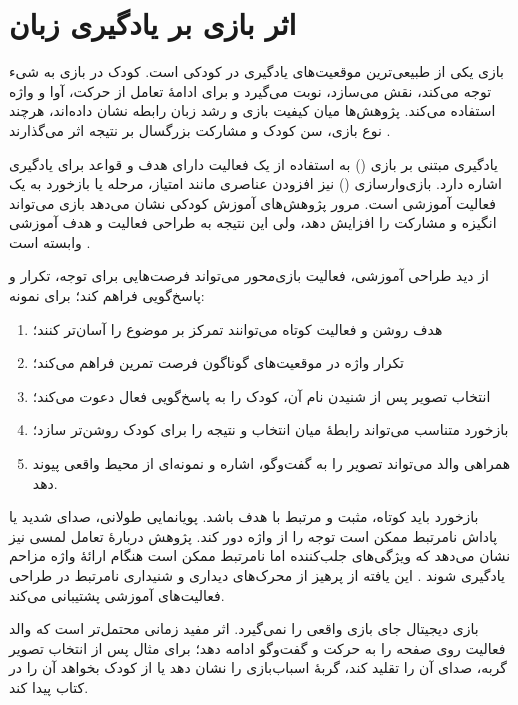 \section{اثر بازی بر یادگیری زبان}

بازی یکی از طبیعی‌ترین موقعیت‌های یادگیری در کودکی است. کودک در بازی به شیء توجه می‌کند، نقش می‌سازد، نوبت می‌گیرد و برای ادامهٔ تعامل از حرکت، آوا و واژه استفاده می‌کند. پژوهش‌ها میان کیفیت بازی و رشد زبان رابطه نشان داده‌اند، هرچند نوع بازی، سن کودک و مشارکت بزرگسال بر نتیجه اثر می‌گذارند \cite{Toub2018PlayLanguage}.

یادگیری مبتنی بر بازی () به استفاده از یک فعالیت دارای هدف و قواعد برای یادگیری اشاره دارد. بازی‌وارسازی () نیز افزودن عناصری مانند امتیاز، مرحله یا بازخورد به یک فعالیت آموزشی است. مرور پژوهش‌های آموزش کودکی نشان می‌دهد بازی می‌تواند انگیزه و مشارکت را افزایش دهد، ولی این نتیجه به طراحی فعالیت و هدف آموزشی وابسته است \cite{Alotaibi2024GameBased}.

از دید طراحی آموزشی، فعالیت بازی‌محور می‌تواند فرصت‌هایی برای توجه، تکرار و پاسخ‌گویی فراهم کند؛ برای نمونه:

\begin{enumerate}
\item هدف روشن و فعالیت کوتاه می‌توانند تمرکز بر موضوع را آسان‌تر کنند؛
\item تکرار واژه در موقعیت‌های گوناگون فرصت تمرین فراهم می‌کند؛
\item انتخاب تصویر پس از شنیدن نام آن، کودک را به پاسخ‌گویی فعال دعوت می‌کند؛
\item بازخورد متناسب می‌تواند رابطهٔ میان انتخاب و نتیجه را برای کودک روشن‌تر سازد؛
\item همراهی والد می‌تواند تصویر را به گفت‌وگو، اشاره و نمونه‌ای از محیط واقعی پیوند دهد.
\end{enumerate}

بازخورد باید کوتاه، مثبت و مرتبط با هدف باشد. پویانمایی طولانی، صدای شدید یا پاداش نامرتبط ممکن است توجه را از واژه دور کند. پژوهش دربارهٔ تعامل لمسی نیز نشان می‌دهد که ویژگی‌های جلب‌کننده اما نامرتبط ممکن است هنگام ارائهٔ واژه مزاحم یادگیری شوند \cite{RussoJohnson2017Touch}. این یافته از پرهیز از محرک‌های دیداری و شنیداری نامرتبط در طراحی فعالیت‌های آموزشی پشتیبانی می‌کند.

بازی دیجیتال جای بازی واقعی را نمی‌گیرد. اثر مفید زمانی محتمل‌تر است که والد فعالیت روی صفحه را به حرکت و گفت‌وگو ادامه دهد؛ برای مثال پس از انتخاب تصویر گربه، صدای آن را تقلید کند، گربهٔ اسباب‌بازی را نشان دهد یا از کودک بخواهد آن را در کتاب پیدا کند.

